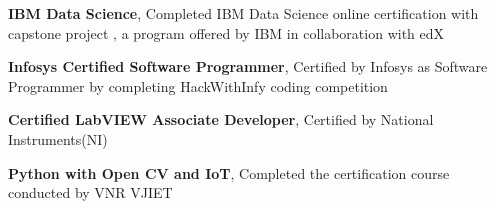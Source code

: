 


\begin{cvparagraph}
\textbf{IBM Data Science}, Completed IBM Data Science online certification with capstone project , a program offered by IBM in collaboration with edX

\textbf{Infosys Certified Software Programmer}, Certified by Infosys as Software Programmer by completing HackWithInfy coding competition

\textbf{Certified LabVIEW Associate Developer}, Certified by National Instruments(NI)

\textbf{Python with Open CV and IoT}, Completed the certification course conducted by VNR VJIET





\end{cvparagraph}
